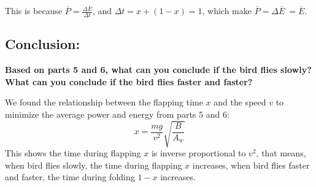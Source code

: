 \documentclass{article}
\begin{document}
This is because \(\overline{P}= \frac{{\Delta \overline{E}}}{\Delta t}\), and \(\Delta t = x + (1-x) =1\), which make \(\overline{P} = \Delta \overline{E}\ = \overline{E}\).

\subsection*{Conclusion:}
{\large \bfseries Based on parts 5 and 6, what can you conclude if the bird flies slowly? What can you conclude if the bird flies faster and faster?}

We found the relationship between the flapping time \(x\) and the speed \(v\) to minimize the average power and energy from parts 5 and 6:
\[x = \frac{mg}{v^2}\sqrt{\frac{B}{A_w}}\]
This shows the time during flapping \(x\) is inverse proportional to \(v^2\), that means, when bird flies slowly, the time during flapping \(x\) increases, when bird flies faster and faster, the time during folding \(1-x\) increases.
\end{document}
